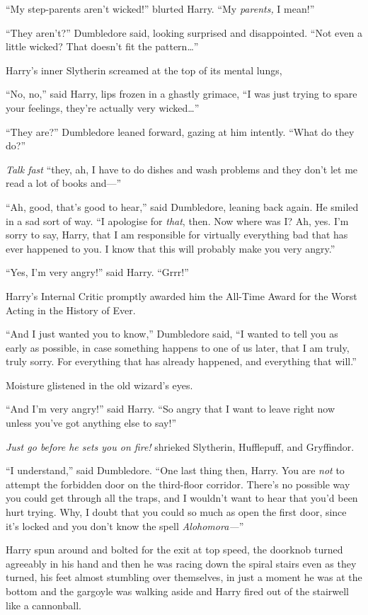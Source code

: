 “My step-parents aren’t wicked!” blurted Harry. “My \emph{parents,} I mean!”

“They aren’t?” Dumbledore said, looking surprised and disappointed. “Not even a little wicked? That doesn’t fit the pattern…”

Harry’s inner Slytherin screamed at the top of its mental lungs, \emph{}

“No, no,” said Harry, lips frozen in a ghastly grimace, “I was just trying to spare your feelings, they’re actually very wicked…”

“They are?” Dumbledore leaned forward, gazing at him intently. “What do they do?”

\emph{Talk fast} “they, ah, I have to do dishes and wash problems and they don’t let me read a lot of books and—”

“Ah, good, that’s good to hear,” said Dumbledore, leaning back again. He smiled in a sad sort of way. “I apologise for \emph{that}, then. Now where was I? Ah, yes. I’m sorry to say, Harry, that I am responsible for virtually everything bad that has ever happened to you. I know that this will probably make you very angry.”

“Yes, I’m very angry!” said Harry. “Grrr!”

Harry’s Internal Critic promptly awarded him the All-Time Award for the Worst Acting in the History of Ever.

“And I just wanted you to know,” Dumbledore said, “I wanted to tell you as early as possible, in case something happens to one of us later, that I am truly, truly sorry. For everything that has already happened, and everything that will.”

Moisture glistened in the old wizard’s eyes.

“And I’m very angry!” said Harry. “So angry that I want to leave right now unless you’ve got anything else to say!”

\emph{Just \emph{go} before he sets you on fire!} shrieked Slytherin, Hufflepuff, and Gryffindor.

“I understand,” said Dumbledore. “One last thing then, Harry. You are \emph{not} to attempt the forbidden door on the third-floor corridor. There’s no possible way you could get through all the traps, and I wouldn’t want to hear that you’d been hurt trying. Why, I doubt that you could so much as open the first door, since it’s locked and you don’t know the spell \emph{Alohomora—}”

Harry spun around and bolted for the exit at top speed, the doorknob turned agreeably in his hand and then he was racing down the spiral stairs even as they turned, his feet almost stumbling over themselves, in just a moment he was at the bottom and the gargoyle was walking aside and Harry fired out of the stairwell like a cannonball.

